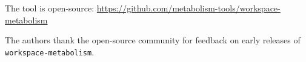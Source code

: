 \documentclass[sigconf]{acmart}
\begin{document}
The tool is open-source: \url{https://github.com/metabolism-tools/workspace-metabolism}

\begin{acks}
The authors thank the open-source community for feedback on early releases of \texttt{workspace-metabolism}.

\end{acks}



\end{document}
